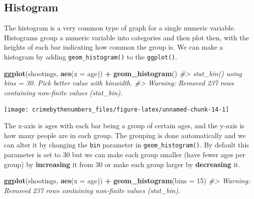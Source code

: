 \documentclass[
  12pt,
]{book}
\newenvironment{Shaded}{\begin{snugshade}}{\end{snugshade}}
\newcommand{\CommentTok}[1]{\textcolor[rgb]{0.37,0.37,0.37}{\textit{#1}}}
\newcommand{\DataTypeTok}[1]{\textcolor[rgb]{0.27,0.27,0.27}{#1}}
\newcommand{\DecValTok}[1]{\textcolor[rgb]{0.06,0.06,0.06}{#1}}
\newcommand{\KeywordTok}[1]{\textcolor[rgb]{0.27,0.27,0.27}{\textbf{#1}}}
\newcommand{\NormalTok}[1]{#1}
\newcommand{\OperatorTok}[1]{\textcolor[rgb]{0.43,0.43,0.43}{\textbf{#1}}}
\newcommand{\StringTok}[1]{\textcolor[rgb]{0.5,0.5,0.5}{#1}}
\begin{document}
\hypertarget{histogram}{%
\subsection{Histogram}\label{histogram}}

The histogram is a very common type of graph for a single numeric variable. Histograms group a numeric variable into categories and then plot then, with the heights of each bar indicating how common the group is. We can make a histogram by adding \texttt{geom\_histogram()} to the \texttt{ggplot()}.

\begin{Shaded}
\begin{Highlighting}[]
\KeywordTok{ggplot}\NormalTok{(shootings, }\KeywordTok{aes}\NormalTok{(}\DataTypeTok{x =}\NormalTok{ age)) }\OperatorTok{+}\StringTok{ }
\StringTok{  }\KeywordTok{geom\_histogram}\NormalTok{()}
\CommentTok{\#> \textasciigrave{}stat\_bin()\textasciigrave{} using \textasciigrave{}bins = 30\textasciigrave{}. Pick better value with \textasciigrave{}binwidth\textasciigrave{}.}
\CommentTok{\#> Warning: Removed 237 rows containing non{-}finite values (stat\_bin).}
\end{Highlighting}
\end{Shaded}

\begin{center}\texttt{[image: crimebythenumbers\_files/figure-latex/unnamed-chunk-14-1]} \end{center}

The x-axis is ages with each bar being a group of certain ages, and the y-axis is how many people are in each group. The grouping is done automatically and we can alter it by changing the \texttt{bin} parameter in \texttt{geom\_histogram()}. By default this parameter is set to 30 but we can make each group smaller (have fewer ages per group) by \textbf{increasing} it from 30 or make each group larger by \textbf{decreasing} it.

\begin{Shaded}
\begin{Highlighting}[]
\KeywordTok{ggplot}\NormalTok{(shootings, }\KeywordTok{aes}\NormalTok{(}\DataTypeTok{x =}\NormalTok{ age)) }\OperatorTok{+}\StringTok{ }
\StringTok{  }\KeywordTok{geom\_histogram}\NormalTok{(}\DataTypeTok{bins =} \DecValTok{15}\NormalTok{)}
\CommentTok{\#> Warning: Removed 237 rows containing non{-}finite values (stat\_bin).}
\end{Highlighting}
\end{Shaded}
\end{document}
